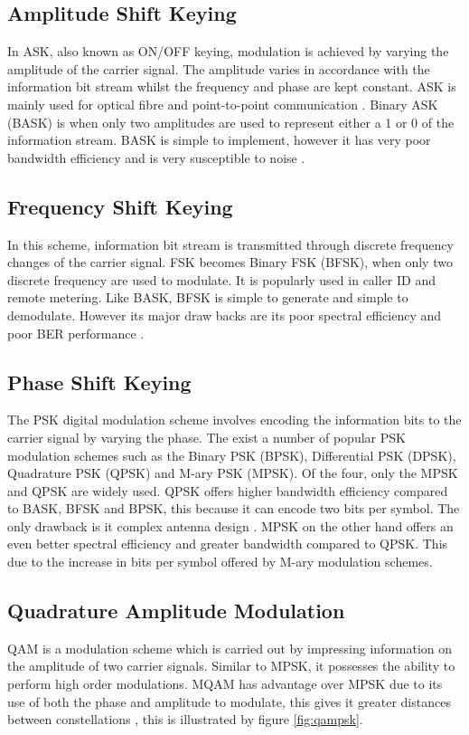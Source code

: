 \documentclass[11pt]{report}
\begin{document}
\subsection{Amplitude Shift Keying}
\label{sub:ask}
In ASK, also known as ON/OFF keying, modulation is achieved by varying the amplitude of the carrier signal. The amplitude varies in accordance with the information bit stream whilst the frequency and phase are kept constant. ASK is mainly used for optical fibre and point-to-point communication \cite{B15}. Binary ASK (BASK) is when only two amplitudes are used to represent either a 1 or 0 of the information stream. BASK is simple to implement, however it has very poor bandwidth efficiency and is very susceptible to noise \cite{60}.

\subsection{Frequency Shift Keying}
\label{sub:fsk}
In this scheme, information bit stream is transmitted through discrete frequency changes of the carrier signal. FSK becomes Binary FSK (BFSK), when only two discrete frequency are used to modulate. It is popularly used in caller ID and remote metering. Like BASK, BFSK is simple to generate and simple to demodulate. However its major draw backs are its poor spectral efficiency and poor BER performance \cite{63}.

\subsection{Phase Shift Keying}
\label{sub:psk}
The PSK digital modulation scheme involves encoding the information bits to the carrier signal by varying the phase. The exist a number of popular PSK modulation schemes such as the Binary PSK (BPSK), Differential PSK (DPSK), Quadrature PSK (QPSK) and M-ary PSK (MPSK). Of the four, only the MPSK and QPSK are widely used. QPSK offers higher bandwidth efficiency compared to BASK, BFSK and BPSK, this because it can encode two bits per symbol. The only drawback is it complex antenna design \cite{60}. MPSK on the other hand offers an even better spectral efficiency and greater bandwidth compared to QPSK. This due to the increase in bits per symbol offered by M-ary modulation schemes.

\subsection{Quadrature Amplitude Modulation}
QAM is a modulation scheme which is carried out by impressing information on the amplitude of two carrier signals. Similar to MPSK, it possesses the ability to perform high order modulations. MQAM has advantage over MPSK due to its use of both the phase and amplitude to modulate, this gives it greater distances between constellations \cite{67}, this is illustrated by figure \ref{fig:qampsk}.
\end{document}
